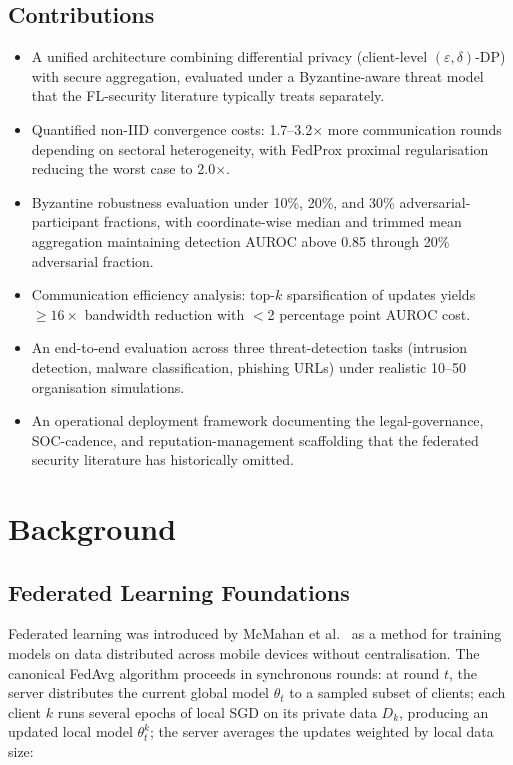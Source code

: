 \documentclass[sigconf,nonacm]{acmart}
\begin{document}
\subsection{Contributions}

\begin{itemize}
  \item A unified architecture combining differential privacy
        (client-level $(\varepsilon, \delta)$-DP) with secure aggregation,
        evaluated under a Byzantine-aware threat model that the FL-security
        literature typically treats separately.
  \item Quantified non-IID convergence costs: 1.7--3.2$\times$ more
        communication rounds depending on sectoral heterogeneity, with
        FedProx proximal regularisation reducing the worst case to
        2.0$\times$.
  \item Byzantine robustness evaluation under 10\%, 20\%, and 30\%
        adversarial-participant fractions, with coordinate-wise median and
        trimmed mean aggregation maintaining detection AUROC above 0.85
        through 20\% adversarial fraction.
  \item Communication efficiency analysis: top-$k$ sparsification of
        updates yields $\geq 16\times$ bandwidth reduction with $<$2 percentage
        point AUROC cost.
  \item An end-to-end evaluation across three threat-detection tasks
        (intrusion detection, malware classification, phishing URLs) under
        realistic 10--50 organisation simulations.
  \item An operational deployment framework documenting the legal-governance,
        SOC-cadence, and reputation-management scaffolding that the federated
        security literature has historically omitted.
\end{itemize}

\section{Background}

\subsection{Federated Learning Foundations}

Federated learning was introduced by McMahan et al.~\cite{mcmahan2017fedavg}
as a method for training models on data distributed across mobile devices
without centralisation. The canonical FedAvg algorithm proceeds in
synchronous rounds: at round $t$, the server distributes the current global
model $\theta_t$ to a sampled subset of clients; each client $k$ runs
several epochs of local SGD on its private data $D_k$, producing an updated
local model $\theta_t^{k}$; the server averages the updates weighted by
local data size:
\end{document}
